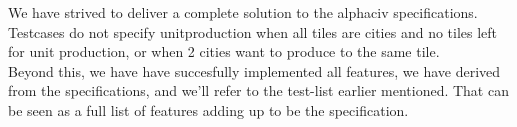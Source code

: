 We have strived to deliver a complete solution to the alphaciv specifications. \\


Testcases do not specify unitproduction when all tiles are cities and no tiles left for unit production, or when 2 cities want to produce to the same tile.\\

Beyond this, we have have succesfully implemented all features, we have derived from the specifications, and we'll refer to the test-list earlier mentioned.
That can be seen as a full list of features adding up to be the specification.

